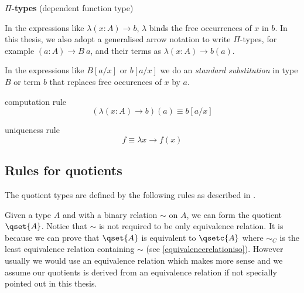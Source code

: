 
\textbf{$\Pi$-types} (dependent function type)

\begin{multicols}{2}
\columnbreak
{}
\end{multicols}


In the expressions like $\lambda (x:A) \to b$, $\lambda$ binds the free occurrences of $x$ in $b$. 
In this thesis, we also adopt a generalised arrow notation to write $\Pi$-types, for example $(a : A) \to B ~ a$, and their terms as $\lambda (x: A) \to b(a)$.

In the expressions like $B[a/x]$ or $b[a/x]$ we do an \emph{standard substitution} in type $B$ or term $b$ that replaces free occurences of $x$ by $a$.


\begin{multicols}{2}
computation rule
$$(\lambda (x:A) \to b)(a) \equiv b[a/x]$$

\columnbreak

uniqueness rule
$$f \equiv \lambda x \to f(x) $$
\end{multicols}






\subsection{Rules for quotients}\label{iqs}

The quotient types are defined by the following rules as described in \cite{Jacobs94quotientsin,hof:95:sm}. 


{\Gamma \vdash {}}

Given a type $A$ and with a binary relation $\sim$ on $A$, we can form the quotient $\qset{A}$.
Notice that $\sim$ is not required to be only equivalence relation. It is because we can prove that $\qset{A}$ is equivalent to $\qsetc{A}$ where $\sim_{C}$ is the least equivalence relation containing $\sim$ (see \autoref{equivalencerelationiso}). However usually we would use an equivalence relation which makes more sense and we assume our quotients is derived from an equivalence relation if not specially pointed out in this thesis.


